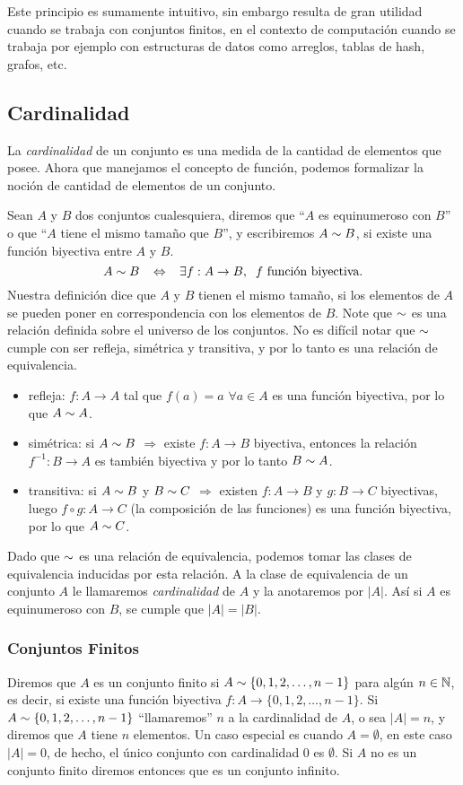 Este principio es sumamente intuitivo, sin embargo resulta de gran utilidad cuando se trabaja con conjuntos finitos, en el contexto de computación cuando se trabaja por ejemplo con estructuras de datos como arreglos, tablas de hash, grafos, etc.

\subsection{Cardinalidad}
La \emph{cardinalidad} de un conjunto es una medida de la cantidad de elementos que posee.
Ahora que manejamos el concepto de función, podemos formalizar la noción de cantidad de elementos de un conjunto.

\begin{definicion}
Sean $A$ y $B$ dos conjuntos cualesquiera, diremos que ``$A$ es equinumeroso con $B$'' o que ``$A$ tiene el mismo tamaño que $B$'', y escribiremos $A\sim B$, si existe una función biyectiva entre $A$ y $B$.
\[
A\sim B\;\;\;\Leftrightarrow\;\;\;\exists f:A\rightarrow B,\;\;f\text{ función biyectiva.}
\]
Nuestra definición dice que $A$ y $B$ tienen el mismo tamaño, si los elementos de $A$ se pueden poner en correspondencia con los elementos de $B$.
Note que $\sim$ es una relación definida sobre el universo de los conjuntos. 
No es difícil notar que $\sim$ cumple con ser refleja, simétrica y transitiva, y por lo tanto es una relación de equivalencia.
\begin{itemize}
  \itemsep 0pt
  \item refleja: $f:A\rightarrow A$ tal que $f(a)=a$ $\forall a\in A$ es una función biyectiva, por lo que $A\sim A$.
  \item simétrica: si $A\sim B$ $\Rightarrow$ existe $f:A\rightarrow B$ biyectiva, entonces la relación $f^{-1}:B\rightarrow A$ es también biyectiva y por lo tanto $B\sim A$.
  \item transitiva: si $A\sim B$ y $B\sim C$ $\Rightarrow$ existen $f:A\rightarrow B$ y $g:B\rightarrow C$ biyectivas, luego $f\circ g:A\rightarrow C$ (la composición de las funciones) es una función biyectiva, por lo que $A\sim C$.
\end{itemize}
Dado que $\sim$ es una relación de equivalencia, podemos tomar las clases de equivalencia inducidas por esta relación.
A la clase de equivalencia de un conjunto $A$ le llamaremos \emph{cardinalidad} de $A$ y la anotaremos por $|A|$.
Así si $A$ es equinumeroso con $B$, se cumple que $|A|=|B|$.
\end{definicion}


\subsubsection*{Conjuntos Finitos}
Diremos que $A$ es un conjunto finito si $A\sim\{0,1,2,\ldots,n-1\}$ para algún $n\in\mathbb{N}$, es decir, si existe una función biyectiva $f:A\rightarrow\{0,1,2,\ldots,n-1\}$.
Si $A\sim\{0,1,2,\ldots,n-1\}$ ``llamaremos'' $n$ a la cardinalidad de $A$, o sea $|A|=n$, y diremos que $A$ tiene $n$ elementos.
Un caso especial es cuando $A=\emptyset$, en este caso $|A|=0$, de hecho, el único conjunto con cardinalidad $0$ es $\emptyset$.
Si $A$ no es un conjunto finito diremos entonces que es un conjunto infinito.

